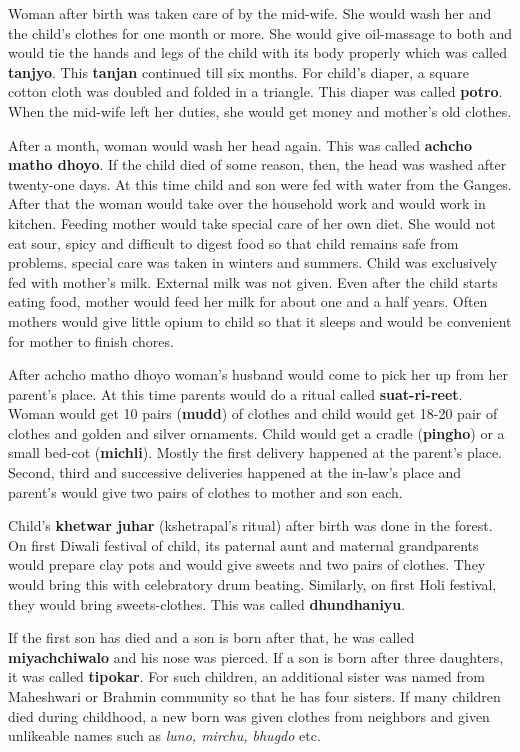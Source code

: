 Woman after birth was taken care of by the mid-wife. She would wash her and
the child's clothes for one month or more. She would give oil-massage to both
and would tie the hands and legs of the child with its body properly which was
called \textbf{tanjyo}. This \textbf{tanjan} continued till six months. For
child's diaper, a square cotton cloth was doubled and folded in a triangle.
This diaper was called \textbf{potro}. When the mid-wife left her duties, she
would get money and mother's old clothes.

After a month, woman would wash her head again. This was called \textbf{achcho
matho dhoyo}. If the child died of some reason, then, the head was washed after
twenty-one days. At this time child and son were fed with water from the
Ganges. After that the woman would take over the household work and would work
in kitchen. Feeding mother would take special care of her own diet. She would
not eat sour, spicy and difficult to digest food so that child remains safe
from problems. special care was taken in winters and summers. Child was
exclusively fed with mother's milk. External milk was not given. Even after the
child starts eating food, mother would feed her milk for about one and a half
years. Often mothers would give little opium to child so that it sleeps and
would be convenient for mother to finish chores.

After achcho matho dhoyo woman's husband would come to pick her up from her
parent's place. At this time parents would do a ritual called
\textbf{suat-ri-reet}. Woman would get 10 pairs (\textbf{mudd}) of clothes and
child would get 18-20 pair of clothes and golden and silver ornaments. Child
would get a cradle (\textbf{pingho}) or a small bed-cot (\textbf{michli}).
Mostly the first delivery happened at the parent's place. Second, third and
successive deliveries happened at the in-law's place and parent's would give
two pairs of clothes to mother and son each.

Child's \textbf{khetwar juhar} (kshetrapal's ritual) after birth was done in
the forest. On first Diwali festival of child, its paternal aunt and maternal
grandparents would prepare clay pots and would give sweets and two pairs of
clothes. They would bring this with celebratory drum beating. Similarly, on
first Holi festival, they would bring sweets-clothes. This was called
\textbf{dhundhaniyu}.

If the first son has died and a son is born after that, he was called
\textbf{miyachchiwalo} and his nose was pierced. If a son is born after three
daughters, it was called \textbf{tipokar}. For such children, an additional
sister was named from Maheshwari or Brahmin community so that he has four
sisters. If many children died during childhood, a new born was given clothes
from neighbors and given unlikeable names such as \textit{luno, mirchu, bhugdo} etc.

